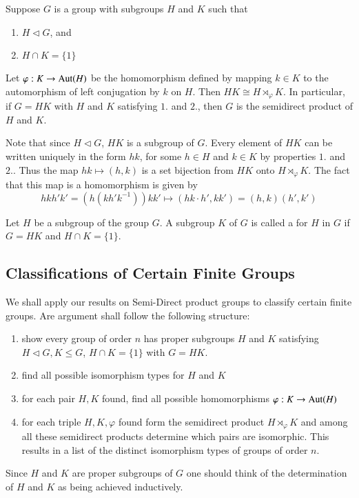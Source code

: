 \documentclass[12pt, a4paper, twoside, openright, titlepage]{book}
\begin{document}
\begin{thm}{}{}
    Suppose $G$ is a group with subgroups $H$ and $K$ such that \begin{enumerate}
        \item $H \vartriangleleft G$, and 
        \item $H\cap K = \{1\}$
    \end{enumerate}
    Let $\varphi:K\rightarrow \operatorname{Aut}(H)$ be the homomorphism defined by mapping $k \in K$ to the automorphism of left conjugation by $k$ on $H$. Then $HK \cong H\rtimes_{\varphi}K$. In particular, if $G = HK$ with $H$ and $K$ satisfying $1.$ and $2.$, then $G$ is the semidirect product of $H$ and $K$.
\end{thm}
\begin{proof*}{}{}
    Note that since $H\vartriangleleft G$, $HK$ is a subgroup of $G$. Every element of $HK$ can be written uniquely in the form $hk$, for some $h \in H$ and $k \in K$ by properties $1.$ and $2.$. Thus the map $hk\mapsto (h,k)$ is a set bijection from $HK$ onto $H\rtimes_{\varphi}K$. The fact that this map is a homomorphism is given by $$hkh'k' = (h(kh'k^{-1}))kk' \mapsto (hk\cdot h',kk') = (h,k)(h',k')$$
\end{proof*}

\begin{defn}{}{}
    Let $H$ be a subgroup of the group $G$. A subgroup $K$ of $G$ is called a  for $H$ in $G$ if $G = HK$ and $H\cap K = \{1\}$.
\end{defn}

\subsection{Classifications of Certain Finite Groups}

We shall apply our results on Semi-Direct product groups to classify certain finite groups. Are argument shall follow the following structure: \begin{enumerate}
    \item show every group of order $n$ has proper subgroups $H$ and $K$ satisfying $H \triangleleft G,K\leq G$, $H\cap K = \{1\}$ with $G = HK$.
    \item find all possible isomorphism types for $H$ and $K$
    \item for each pair $H,K$ found, find all possible homomorphisms $\varphi:K\rightarrow \operatorname{Aut}(H)$
    \item for each triple $H,K,\varphi$ found form the semidirect product $H \rtimes_{\varphi}K$ and among all these semidirect products determine which pairs are isomorphic. This results in a list of the distinct isomorphism types of groups of order $n$.
\end{enumerate}
Since $H$ and $K$ are proper subgroups of $G$ one should think of the determination of $H$ and $K$ as being achieved inductively.
\end{document}
